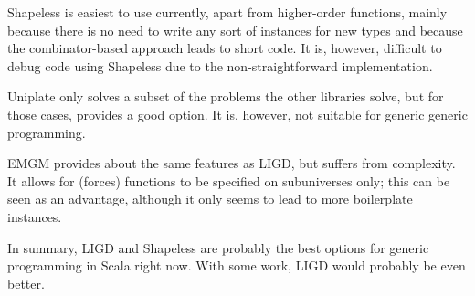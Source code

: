 Shapeless is easiest to use currently, apart from higher-order functions,
mainly because there is no need to write any sort of instances for new types
and because the combinator-based approach leads to short code. It is, however,
difficult to debug code using Shapeless due to the non-straightforward
implementation.

Uniplate only solves a subset of the problems the other libraries solve, but
for those cases, provides a good option. It is, however, not suitable for
generic generic programming.

EMGM provides about the same features as LIGD, but suffers from complexity. It
allows for (forces) functions to be specified on subuniverses only; this can be
seen as an advantage, although it only seems to lead to more boilerplate instances.

In summary, LIGD and Shapeless are probably the best options for generic
programming in Scala right now. With some work, LIGD would probably be even
better.

